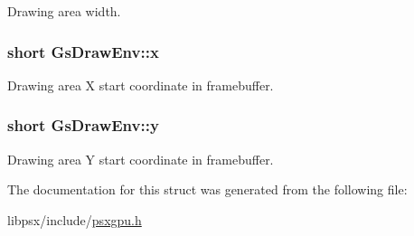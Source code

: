 Drawing area width. 

\hypertarget{structGsDrawEnv_a6fb0977769dc3447f2f1679dc99d1a86}{}
\subsubsection[{x}]{\setlength{\rightskip}{0pt plus 5cm}short Gs\+Draw\+Env\+::x}\label{structGsDrawEnv_a6fb0977769dc3447f2f1679dc99d1a86}


Drawing area X start coordinate in framebuffer. 

\hypertarget{structGsDrawEnv_a9a6e3bb414996687c92f747fdaefd394}{}
\subsubsection[{y}]{\setlength{\rightskip}{0pt plus 5cm}short Gs\+Draw\+Env\+::y}\label{structGsDrawEnv_a9a6e3bb414996687c92f747fdaefd394}


Drawing area Y start coordinate in framebuffer. 



The documentation for this struct was generated from the following file\+:\begin{DoxyCompactItemize}
\item 
libpsx/include/\hyperlink{psxgpu_8h}{psxgpu.\+h}\end{DoxyCompactItemize}
